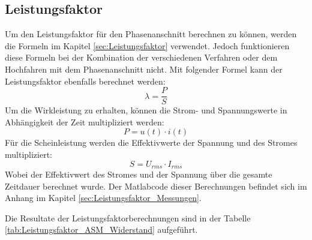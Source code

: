 \newpage
\subsection{Leistungsfaktor}
Um den Leistungsfaktor für den Phasenanschnitt berechnen zu können, werden die Formeln im Kapitel \ref{sec:Leistungsfaktor} verwendet. Jedoch funktionieren diese Formeln bei der Kombination der verschiedenen Verfahren oder dem Hochfahren mit dem Phasenanschnitt nicht. Mit folgender Formel kann der Leistungsfaktor ebenfalls berechnet werden:
\begin{equation}
\lambda = \frac{P}{S}
\end{equation}
Um die Wirkleistung zu erhalten, können die Strom- und Spannungswerte in Abhängigkeit der Zeit  multipliziert werden:
\begin{equation}
P = u(t) \cdot i(t)
\end{equation}
Für die Scheinleistung werden die Effektivwerte der Spannung und des Stromes multipliziert:
\begin{equation}
S = U_{rms} \cdot I_{rms}
\end{equation}
Wobei der Effektivwert des Stromes und der Spannung über die gesamte Zeitdauer berechnet wurde. Der Matlabcode dieser Berechnungen befindet sich im Anhang im Kapitel \ref{sec:Leistungsfaktor_Messungen}. 

Die Resultate der Leistungsfaktorberechnungen sind in der Tabelle \ref{tab:Leistungsfaktor_ASM_Widerstand} aufgeführt.

